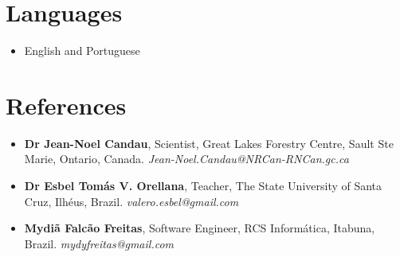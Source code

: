 \documentclass[10pt, a4paper, oneside, final]{scrartcl} %
\begin{document}

\section{Languages}

\begin{itemize} \itemsep1pt \parskip0pt 
  \item English and Portuguese 
\end{itemize}


\section{References}

\begin{itemize} \itemsep2pt \parskip0pt 
\item \textbf{Dr Jean-Noel Candau}, Scientist, Great Lakes Forestry Centre, Sault Ste Marie, Ontario, Canada. \textit{Jean-Noel.Candau@NRCan-RNCan.gc.ca}

\item \textbf{Dr Esbel Tomás V. Orellana}, Teacher, The State University of Santa Cruz, Ilhéus, Brazil. \textit{valero.esbel@gmail.com} 

\item \textbf{Mydiã Falcão Freitas}, Software Engineer, RCS Informática, Itabuna, Brazil. \textit{mydyfreitas@gmail.com} 
\end{itemize}

\end{document}
